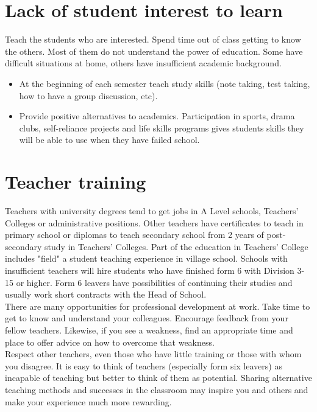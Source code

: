 \section{Lack of student interest to learn}
Teach the students who are interested.  Spend time out of class
getting to know the others.  Most of them do not understand the power
of education.  Some have difficult situations at home, others have
insufficient academic background.
\begin{itemize}
\item At the beginning of each semester teach study skills (note taking, test taking, how to have a group discussion, etc).
\item Provide positive alternatives to academics. Participation in sports, drama clubs, self-reliance projects and life skills programs gives students skills they will be able to use when they have failed school.
\end{itemize}
\section{Teacher training}
Teachers with university degrees tend to get jobs in A Level schools,
Teachers' Colleges or administrative positions.  Other teachers have
certificates to teach in primary school or diplomas to teach secondary
school from 2 years of post-secondary study in Teachers' Colleges.
Part of the education in Teachers' College includes "field" a student
teaching experience in village school.  Schools with insufficient
teachers will hire students who have finished form 6 with Division
3-15 or higher.  Form 6 leavers have possibilities of continuing their
studies and usually work short contracts with the Head of School.\\

There are many opportunities for professional development at work.
Take time to get to know and understand  your colleagues.  Encourage
feedback from your fellow teachers.  Likewise, if you see a weakness,
find an appropriate time and place to offer advice on how to overcome
that weakness.\\

Respect other teachers, even those who have little training or those
with whom you disagree.  It is easy to think of teachers (especially
form six leavers) as incapable of teaching but better to think of them
as potential.  Sharing alternative teaching methods and successes in
the classroom may inspire you and others and make your experience much
more rewarding.

